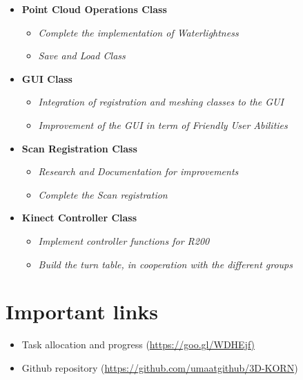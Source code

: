 \documentclass[11pt]{article} %
\begin{document}
\begin{itemize}

\item \textbf{Point Cloud Operations Class}
\begin{itemize}
\item \textit{Complete the implementation of Waterlightness}
\item \textit{Save and Load Class}
\end{itemize}

\item \textbf{GUI Class}
\begin{itemize}
\item \textit{Integration of registration and meshing classes to the GUI}
\item \textit{Improvement of the GUI in term of Friendly User Abilities}
\end{itemize}

\item \textbf{Scan Registration Class}
\begin{itemize}
\item \textit{Research and Documentation for improvements}
\item \textit{Complete the Scan registration}
\end{itemize}

\item \textbf{Kinect Controller Class}
\begin{itemize}
\item \textit{Implement controller functions for R200}
\item \textit{Build the turn table, in cooperation with the different groups}
\end{itemize}


\end{itemize}

\section{Important links}
\begin{itemize}
\item Task allocation and progress  (\url{https://goo.gl/WDHEjf)}
\item Github repository (\url{https://github.com/umaatgithub/3D-KORN})
\end{itemize}
\end{document}
